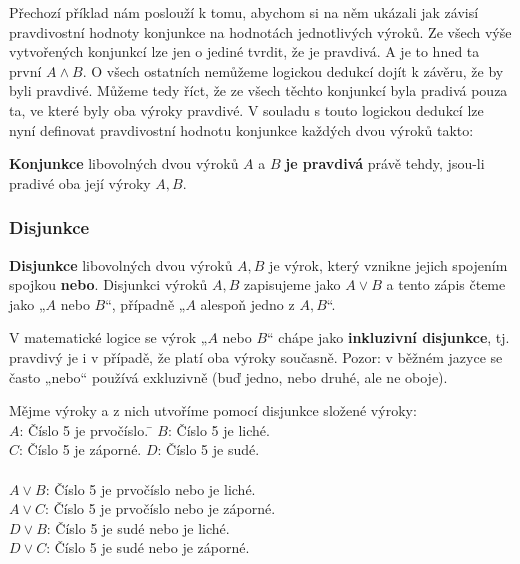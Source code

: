 \documentclass[12pt,a4paper]{article}
\begin{document}
Přechozí příklad nám poslouží k tomu, abychom si na něm ukázali jak závisí pravdivostní hodnoty konjunkce na hodnotách jednotlivých výroků.
Ze všech výše vytvořených konjunkcí lze jen o jediné tvrdit, že je pravdivá. A je to hned ta první $A \land B$. O všech ostatních nemůžeme logickou dedukcí
dojít k závěru, že by byli pravdivé. Můžeme tedy říct, že ze všech těchto konjunkcí byla pradivá pouza ta, ve které byly oba výroky pravdivé.
V souladu s touto logickou dedukcí lze nyní definovat pravdivostní hodnotu konjunkce každých dvou výroků takto:

\begin{definitionbox}
    \textbf{Konjunkce} libovolných dvou výroků $A$ a $B$ \textbf{je pravdivá} právě tehdy, jsou-li pradivé oba její výroky $A,B$.
\end{definitionbox}


\subsubsection*{Disjunkce}
\begin{definitionbox}
    \textbf{Disjunkce} libovolných dvou výroků $A, B$ je výrok, který vznikne jejich spojením spojkou \textbf{nebo}.  
    Disjunkci výroků $A, B$ zapisujeme jako $A \lor B$ a tento zápis čteme jako „$A$ nebo $B$“, případně „$A$ alespoň jedno z $A, B$“.
\end{definitionbox}

\begin{notebox}
V matematické logice se výrok „$A$ nebo $B$“ chápe jako \textbf{inkluzivní disjunkce}, tj. pravdivý je i v případě, že platí oba výroky současně.  
Pozor: v běžném jazyce se často „nebo“ používá exkluzivně (buď jedno, nebo druhé, ale ne oboje).
\end{notebox}

\begin{examplebox}
\begin{tabbing}
    Mějme výroky a z nich utvoříme pomocí disjunkce složené výroky:\\
    $A$: Číslo 5 je prvočíslo. \= 
    $B$: Číslo 5 je liché.\\
    $C$: Číslo 5 je záporné.\>
    $D$: Číslo 5 je sudé.\\
    \\
    $A \lor B$: Číslo 5 je prvočíslo nebo je liché. \\ 
    $A \lor C$: Číslo 5 je prvočíslo nebo je záporné.\\
    $D \lor B$: Číslo 5 je sudé nebo je liché.\\
    $D \lor C$: Číslo 5 je sudé nebo je záporné.
\end{tabbing}
\end{examplebox}
\end{document}
